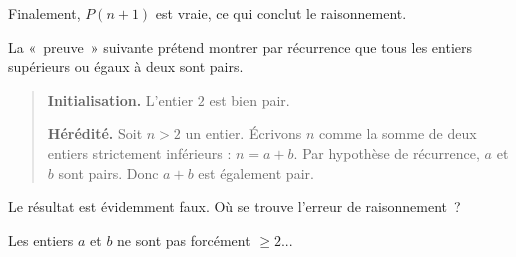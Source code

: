 \begin{exo}[Coloriage]
\begin{sol}
Finalement, $P(n+1)$ est vraie, ce qui conclut le raisonnement.
\end{sol}
\end{exo}



\begin{exo}
La «~preuve~» suivante prétend montrer par récurrence que tous les entiers supérieurs ou égaux à deux sont pairs.

\begin{quote}
  \textbf{Initialisation.} L'entier $2$ est bien pair.

  \textbf{Hérédité.} Soit $n>2$ un entier. Écrivons $n$ comme la somme de deux entiers strictement inférieurs : $n=a+b$. Par hypothèse de récurrence, $a$ et $b$ sont pairs. Donc $a+b$ est également pair.
\end{quote}

Le résultat est évidemment faux. Où se trouve  l'erreur de raisonnement~?
\begin{sol}
Les entiers $a$ et $b$ ne sont pas forcément $\geq 2$...
\end{sol}
\end{exo}




